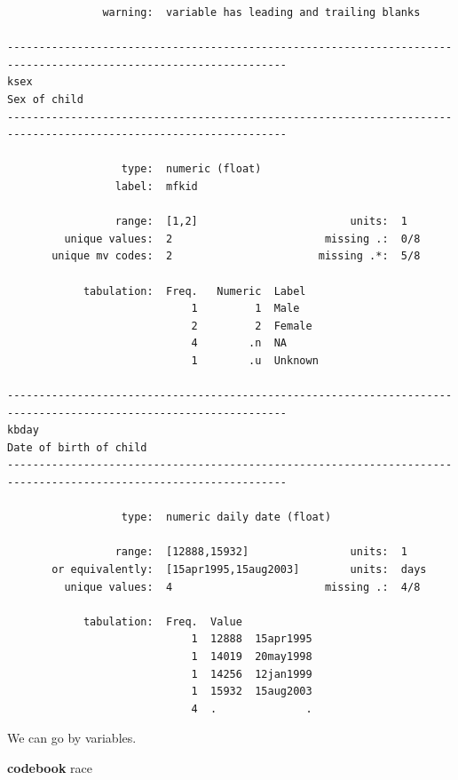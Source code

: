 \documentclass[
]{book}
\newenvironment{Shaded}{\begin{snugshade}}{\end{snugshade}}
\newcommand{\KeywordTok}[1]{\textcolor[rgb]{0.13,0.29,0.53}{\textbf{#1}}}
\newcommand{\NormalTok}[1]{#1}
\begin{document}
\begin{verbatim}
               warning:  variable has leading and trailing blanks

------------------------------------------------------------------------------------------------------------------
ksex                                                                                                  Sex of child
------------------------------------------------------------------------------------------------------------------

                  type:  numeric (float)
                 label:  mfkid

                 range:  [1,2]                        units:  1
         unique values:  2                        missing .:  0/8
       unique mv codes:  2                       missing .*:  5/8

            tabulation:  Freq.   Numeric  Label
                             1         1  Male
                             2         2  Female
                             4        .n  NA
                             1        .u  Unknown

------------------------------------------------------------------------------------------------------------------
kbday                                                                                       Date of birth of child
------------------------------------------------------------------------------------------------------------------

                  type:  numeric daily date (float)

                 range:  [12888,15932]                units:  1
       or equivalently:  [15apr1995,15aug2003]        units:  days
         unique values:  4                        missing .:  4/8

            tabulation:  Freq.  Value
                             1  12888  15apr1995
                             1  14019  20may1998
                             1  14256  12jan1999
                             1  15932  15aug2003
                             4  .              .
\end{verbatim}

We can go by variables.

\begin{Shaded}
\begin{Highlighting}[]
\KeywordTok{codebook}\NormalTok{ race}
\end{Highlighting}
\end{Shaded}
\end{document}
